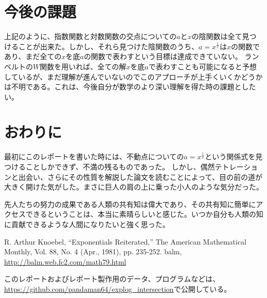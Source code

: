 \section{今後の課題}

	上記のように、指数関数と対数関数の交点についての$a$と$x$の陰関数は全て見つけることが出来た。しかし、それら見つけた陰関数のうち、$a=x^{\frac{1}{x}}$は$x$の関数であり、まだ全ての$x$を底$a$の関数で表わすという目標は達成できていない。
	ランベルトの$W$関数を用いれば、全ての解$x$を底$a$で表わすことも可能になると予想しているが、まだ理解が進んでいないのでこのアプローチが上手くいくかどうかは不明である。これは、今後自分が数学のより深い理解を得た時の課題としたい。
	
\section{おわりに}

	最初にこのレポートを書いた時には、不動点についての$a=x^{\frac{1}{x}}$という関係式を見つけることしかできず、不満の残るものであった。
	しかし、偶然テトレーションと出会い、さらにその性質を解説した論文\cite{knoebel}を読むことによって、目の前の道が大きく開けた気がした。まさに巨人の肩の上に乗った小人のような気分だった。
	
	先人たちの努力の成果である人類の共有知は偉大であり、その共有知に簡単にアクセスできるということは、本当に素晴らしいと感じた。いつか自分も人類の知に貢献できるような人間になりたいと強く思った。
	
\begin{thebibliography}{9}
	 R. Arthur Knoebel, ``Exponentials Reiterated,'' The American Mathematical Monthly, Vol. 88, No. 4 (Apr., 1981), pp. 235-252.
	 balm, \url{http://balm.web.fc2.com/math79.html}
\end{thebibliography}

このレポートおよびレポート製作用のデータ、プログラムなどは、\url{https://github.com/pandaman64/explog_intersection}で公開している。